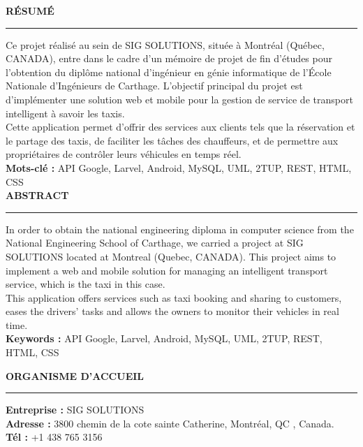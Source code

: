 \documentclass[12pt,a4paper]{report}
\begin{document}
\pagestyle{fancy}
\rhead{}
\chead{}
\lhead{}
\cfoot{}
\rfoot{}
\begin{spacing}{1.5}

\textbf{\large RÉSUMÉ}
\vspace*{5mm}
\hrule
\vspace*{10mm}
Ce projet réalisé au sein de SIG SOLUTIONS, située à Montréal (Québec, CANADA), entre dans le cadre d'un mémoire de projet de fin d'études pour l'obtention du diplôme national d'ingénieur en génie informatique de l'École Nationale d'Ingénieurs de Carthage. L'objectif principal du projet est d'implémenter une solution web et mobile pour la gestion de service de transport intelligent à savoir les taxis.\\
Cette application permet d'offrir des services aux clients tels que la réservation et le partage des taxis, de faciliter les tâches des chauffeurs, et de permettre aux propriétaires de contrôler leurs véhicules en temps réel.\\

\textbf{Mots-clé :} API Google, Larvel, Android, MySQL, UML, 2TUP, REST, HTML, CSS\\

\vspace*{2cm}
\textbf{\large ABSTRACT}
\vspace*{5mm}
\hrule
\vspace*{10mm}
In order to obtain the national engineering diploma in computer science from the National Engineering School of Carthage, we carried a project at SIG SOLUTIONS located at Montreal (Quebec, CANADA). This project aims to implement a web and mobile solution for managing an intelligent transport service, which is the taxi in this case.\\
This application offers services such as taxi booking and sharing to customers, eases the drivers’ tasks and allows the owners to monitor their vehicles in real time.\\

\textbf{Keywords :} API Google, Larvel, Android, MySQL, UML, 2TUP, REST, HTML, CSS\\


\end{spacing}
\vspace*{2.5cm}
\textbf{ORGANISME D'ACCUEIL}
\vspace*{3mm}
\hrule
\vspace*{5mm}
\hspace*{-6mm}\textbf{Entreprise :} SIG SOLUTIONS\\
\textbf{Adresse :} 3800 chemin de la cote sainte Catherine, Montréal, QC , Canada.\\
\textbf{Tél :} +1 438 765 3156 \\
\end{document}
